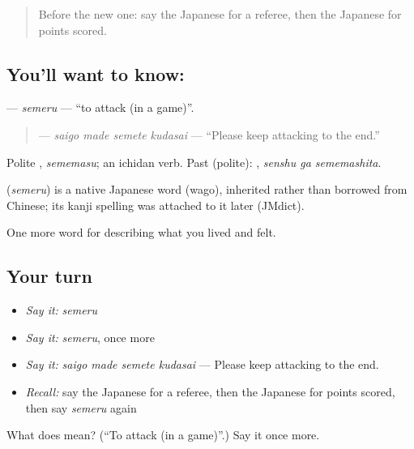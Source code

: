 \begin{quote}
Before the new one: say the Japanese for a referee, then the Japanese for points scored.
\end{quote}

\subsection*{You'll want to know: }
\textbf{} — \emph{semeru} — \textquotedblleft{}to attack (in a game)\textquotedblright{}.

\begin{quote}
\textbf{  } — \emph{saigo made semete kudasai} — \textquotedblleft{}Please keep attacking to the end.\textquotedblright{}
\end{quote}

Polite \textbf{}, \emph{sememasu}; an ichidan verb. Past (polite): \textbf{ }, \emph{senshu ga sememashita}.

\begin{cousinweb}
\textbf{} (\emph{semeru}) is a native Japanese word (wago), inherited rather than borrowed from Chinese; its kanji spelling was attached to it later (JMdict).
\end{cousinweb}

\begin{grammarlens}[title={What you've built}]
One more word for describing what you lived and felt.
\end{grammarlens}

\subsection*{Your turn}
\begin{itemize}
\raggedright
  \item \emph{Say it:} \emph{semeru}
  \item \emph{Say it:} \emph{semeru}, once more
  \item \emph{Say it:} \emph{saigo made semete kudasai} — Please keep attacking to the end.
  \item \emph{Recall:} say the Japanese for a referee, then the Japanese for points scored, then say \emph{semeru} again
\end{itemize}

\begin{tcolorbox}[breakable,colback=teal!4,colframe=teal!35!black,title={Before you move on}]
What does  mean? (\textquotedblleft{}To attack (in a game)\textquotedblright{}.) Say it once more.
\end{tcolorbox}
